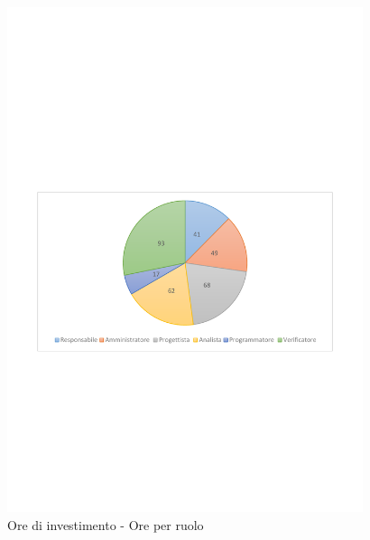 \documentclass[../PianoProgetto.tex]{subfiles}
\begin{document}
	\begin{figure}[!h]
		\centering
		\includegraphics[width=0.93\textwidth , trim=2cm 9.5cm 2cm 11cm]{grafici/Riepilogo/Investimento/ore-ruolo}
			\caption{Ore di investimento - Ore per ruolo}
		\label{fig:CircleChart-investimento_ore_r}
	\end{figure}
\vfill	
\newpage
\end{document}
